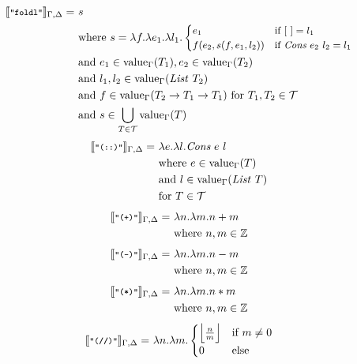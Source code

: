\documentclass[]{scrbook}
\newcommand{\semantic}[1]{\llbracket \text{\footnotesize\texttt{#1}} \rrbracket}
\theoremstyle{definition}
\theoremstyle{definition}
\theoremstyle{definition}
\theoremstyle{remark}
\begin{document}
\[\begin{aligned}
\semantic{"foldl"}_{\Gamma,\Delta} =\ &s\\
  &\text{where }
s = \lambda f. \lambda e_1. \lambda l_1.\small\begin{cases}
        e_1 &\text{if } [\ ] = l_1\\
        f(e_2, s(f,e_1,l_2)) & \text{if } \textit{Cons} \ e_2 \ l_2 = l_1
      \end{cases}\\
     &\text{and }e_1\in\text{value}_\Gamma(T_1),e_2\in\text{value}_\Gamma(T_2)\\
        &\text{and } l_1,l_2\in\text{value}_\Gamma(\mathit{List} \ T_2)\\
    &\text{and } f\in\text{value}_\Gamma(T_2\to T_1 \to T_1) \text{ for } T_1,T_2\in\mathcal{T}\\
    &\text{and }s\in\bigcup_{T\in\mathcal{T}}\text{value}_\Gamma(T)
\end{aligned}
\] \[
\begin{aligned}
\semantic{"(::)"}_{\Gamma,\Delta} =\ & \lambda e. \lambda l. \textit{Cons} \ e \ l\\
    & \text{where } e\in\text{value}_\Gamma(T)\\
    & \text{and } l\in\text{value}_\Gamma(\mathit{List} \ T)\\
    & \text{for } T\in\mathcal{T}
\end{aligned}
\] \[
\begin{aligned}
\semantic{"(+)"}_{\Gamma,\Delta} =\ & \lambda n.\lambda m. n + m\\
    & \text{where } n,m\in\mathbb{Z}
\end{aligned}
\] \[
\begin{aligned}
\semantic{"(-)"}_{\Gamma,\Delta} =\ & \lambda n.\lambda m. n - m\\
    & \text{where } n,m\in\mathbb{Z}
\end{aligned}
\] \[
\begin{aligned}
\semantic{"(*)"}_{\Gamma,\Delta} =\ & \lambda n.\lambda m. n * m\\
    & \text{where } n,m\in\mathbb{Z}
\end{aligned}
\] \[
\begin{aligned}
\semantic{"(//)"}_{\Gamma,\Delta} =\ &\lambda n.\lambda m. \begin{cases} \Big\lfloor \frac{n}{m} \Big\rfloor& \text{if } m \neq 0\\
        0& \text{else}\end{cases}\\

\end{aligned}\]
\end{document}
